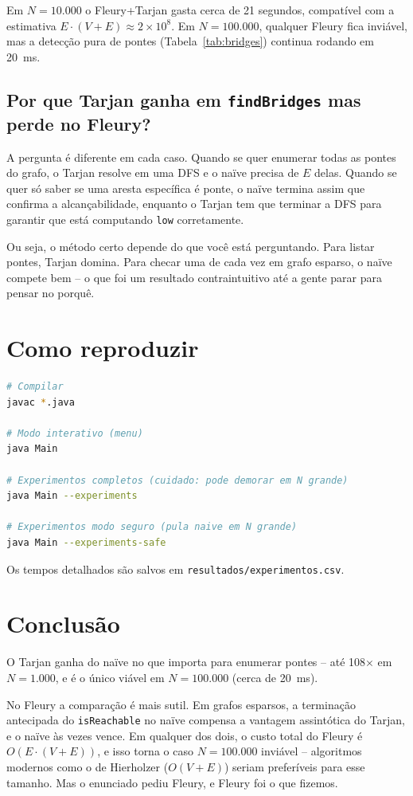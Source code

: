 \documentclass[a4paper,11pt]{article}
\begin{document}
Em $N=10.000$ o Fleury+Tarjan gasta cerca de 21 segundos, compatível com a estimativa $E\cdot(V+E)\approx 2\times 10^8$. Em $N=100.000$, qualquer Fleury fica inviável, mas a detecção pura de pontes (Tabela~\ref{tab:bridges}) continua rodando em 20~ms.

\subsection{Por que Tarjan ganha em \texttt{findBridges} mas perde no Fleury?}

A pergunta é diferente em cada caso. Quando se quer enumerar todas as pontes do grafo, o Tarjan resolve em uma DFS e o naïve precisa de $E$ delas. Quando se quer só saber se uma aresta específica é ponte, o naïve termina assim que confirma a alcançabilidade, enquanto o Tarjan tem que terminar a DFS para garantir que está computando \texttt{low} corretamente.

Ou seja, o método certo depende do que você está perguntando. Para listar pontes, Tarjan domina. Para checar uma de cada vez em grafo esparso, o naïve compete bem -- o que foi um resultado contraintuitivo até a gente parar para pensar no porquê.

\section{Como reproduzir}

\begin{lstlisting}[language=bash]
# Compilar
javac *.java

# Modo interativo (menu)
java Main

# Experimentos completos (cuidado: pode demorar em N grande)
java Main --experiments

# Experimentos modo seguro (pula naive em N grande)
java Main --experiments-safe
\end{lstlisting}

Os tempos detalhados são salvos em \texttt{resultados/experimentos.csv}.

\section{Conclusão}

O Tarjan ganha do naïve no que importa para enumerar pontes -- até 108$\times$ em $N=1.000$, e é o único viável em $N=100.000$ (cerca de 20~ms).

No Fleury a comparação é mais sutil. Em grafos esparsos, a terminação antecipada do \texttt{isReachable} no naïve compensa a vantagem assintótica do Tarjan, e o naïve às vezes vence. Em qualquer dos dois, o custo total do Fleury é $O(E\cdot(V+E))$, e isso torna o caso $N=100.000$ inviável -- algoritmos modernos como o de Hierholzer ($O(V+E)$) seriam preferíveis para esse tamanho. Mas o enunciado pediu Fleury, e Fleury foi o que fizemos.
\end{document}
